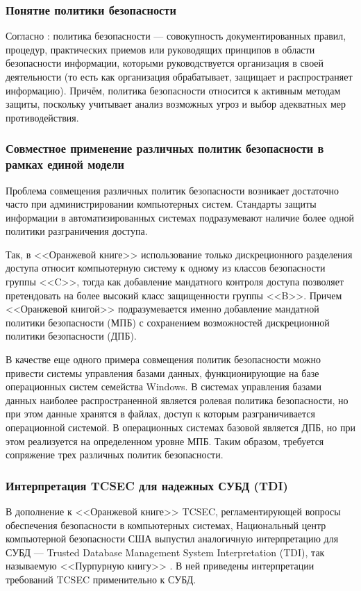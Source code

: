 \subsubsection{Понятие политики безопасности}
Согласно \cite{GOST50922}: политика безопасности --- совокупность документированных
правил, процедур, практических приемов или руководящих принципов в области безопасности
информации, которыми руководствуется организация в своей деятельности (то есть как организация
обрабатывает, защищает и распространяет информацию). Причём, политика безопасности относится
к активным методам защиты, поскольку учитывает анализ возможных угроз и выбор адекватных мер
противодействия.

\subsubsection{Совместное применение различных политик безопасности в рамках единой модели}
Проблема совмещения различных политик безопасности возникает достаточно часто при администрировании компьютерных систем. Стандарты защиты информации в автоматизированных системах подразумевают наличие более одной политики разграничения доступа.

Так, в <<Оранжевой книге>> использование только дискреционного разделения доступа относит компьютерную систему к одному из классов безопасности группы <<C>>, тогда как добавление мандатного контроля доступа позволяет претендовать на более высокий класс защищенности группы <<B>>. Причем <<Оранжевой книгой>> подразумевается именно добавление мандатной политики безопасности (МПБ) с сохранением возможностей дискреционной политики безопасности (ДПБ).

В качестве еще одного примера совмещения политик безопасности можно привести системы управления базами данных, функционирующие на базе операционных систем семейства Windows. В системах управления базами данных наиболее распространенной является ролевая политика безопасности, но при этом данные хранятся в файлах, доступ к которым разграничивается операционной системой. В операционных системах базовой является ДПБ, но при этом реализуется на определенном уровне МПБ. Таким образом, требуется сопряжение трех различных политик безопасности. \cite{CombinedSecurityPolicies}

\subsubsection{Интерпретация TCSEC для надежных СУБД (TDI)}
В дополнение к <<Оранжевой книге>> TCSEC, регламентирующей вопросы обеспечения безопасности в компьютерных системах, Национальный центр компьютерной безопасности США выпустил аналогичную интерпретацию для СУБД --- Trusted Database Management System Interpretation (TDI), так называемую <<Пурпурную книгу>> \cite{PurpleBook}.
В ней приведены интерпретации требований TCSEC применительно к СУБД.


